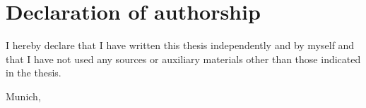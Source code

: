 \chapter*{Declaration of authorship}
\thispagestyle{empty}

I hereby declare that I have written this thesis independently and by myself and that I have not used any sources or auxiliary materials other than those indicated in the thesis.

  \vspace{3\baselineskip}
  
  Munich, \getSubmissionDateEN \hspace{0.25\linewidth}\parbox{0.3\linewidth}{\dotfill}


